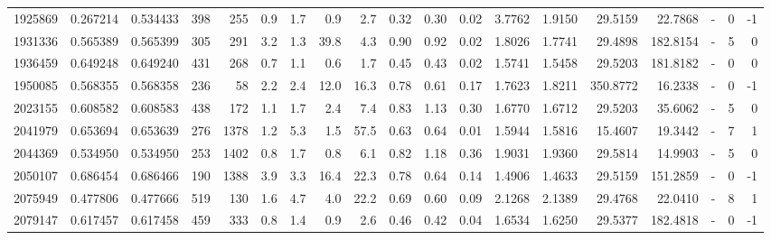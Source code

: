 \begin{tabular}{rrrrrrrrrrrrrrrrlrr}
   1925869 & 0.267214 &   0.534433 &  398 &  255 &      0.9 &      1.7 &     0.9 &      2.7 &       0.32 &        0.30 &        0.02 &  3.7762 &  1.9150 &   29.5159 &   22.7868 &             - &        0 &         -1 \\
   1931336 & 0.565389 &   0.565399 &  305 &  291 &      3.2 &      1.3 &    39.8 &      4.3 &       0.90 &        0.92 &        0.02 &  1.8026 &  1.7741 &   29.4898 &  182.8154 &             - &        5 &          0 \\
   1936459 & 0.649248 &   0.649240 &  431 &  268 &      0.7 &      1.1 &     0.6 &      1.7 &       0.45 &        0.43 &        0.02 &  1.5741 &  1.5458 &   29.5203 &  181.8182 &             - &        0 &          0 \\
   1950085 & 0.568355 &   0.568358 &  236 &   58 &      2.2 &      2.4 &    12.0 &     16.3 &       0.78 &        0.61 &        0.17 &  1.7623 &  1.8211 &  350.8772 &   16.2338 &             - &        0 &         -1 \\
   2023155 & 0.608582 &   0.608583 &  438 &  172 &      1.1 &      1.7 &     2.4 &      7.4 &       0.83 &        1.13 &        0.30 &  1.6770 &  1.6712 &   29.5203 &   35.6062 &             - &        5 &          0 \\
   2041979 & 0.653694 &   0.653639 &  276 & 1378 &      1.2 &      5.3 &     1.5 &     57.5 &       0.63 &        0.64 &        0.01 &  1.5944 &  1.5816 &   15.4607 &   19.3442 &             - &        7 &          1 \\
   2044369 & 0.534950 &   0.534950 &  253 & 1402 &      0.8 &      1.7 &     0.8 &      6.1 &       0.82 &        1.18 &        0.36 &  1.9031 &  1.9360 &   29.5814 &   14.9903 &             - &        5 &          0 \\
   2050107 & 0.686454 &   0.686466 &  190 & 1388 &      3.9 &      3.3 &    16.4 &     22.3 &       0.78 &        0.64 &        0.14 &  1.4906 &  1.4633 &   29.5159 &  151.2859 &             - &        0 &         -1 \\
   2075949 & 0.477806 &   0.477666 &  519 &  130 &      1.6 &      4.7 &     4.0 &     22.2 &       0.69 &        0.60 &        0.09 &  2.1268 &  2.1389 &   29.4768 &   22.0410 &             - &        8 &          1 \\
   2079147 & 0.617457 &   0.617458 &  459 &  333 &      0.8 &      1.4 &     0.9 &      2.6 &       0.46 &        0.42 &        0.04 &  1.6534 &  1.6250 &   29.5377 &  182.4818 &             - &        0 &         -1 \\

\end{tabular}
